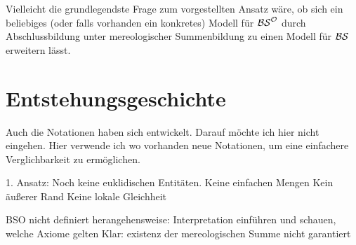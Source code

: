     Vielleicht
    die grundlegendste Frage zum vorgestellten Ansatz wäre,
    ob sich ein beliebiges (oder falls vorhanden ein konkretes) Modell für $\mathcal{BS}^{\mathcal{O}}$ durch Abschlussbildung unter mereologischer Summenbildung zu einen Modell für $\mathcal{BS}$ erweitern lässt.
% 
% 
% 
%     
%              
%         
% 
%     
%     
    
    \section{Entstehungsgeschichte}
    
    Auch die Notationen haben sich entwickelt. Darauf möchte ich hier nicht eingehen.
    Hier verwende ich wo vorhanden neue Notationen, um eine einfachere Verglichbarkeit zu ermöglichen.
    
    1. Ansatz:
    Noch keine euklidischen Entitäten.
    Keine einfachen Mengen
    Kein äußerer Rand
    Keine lokale Gleichheit
    
    BSO nicht definiert
    herangehensweise: Interpretation einführen und schauen, welche Axiome gelten
    Klar: existenz der mereologischen Summe nicht garantiert
    
